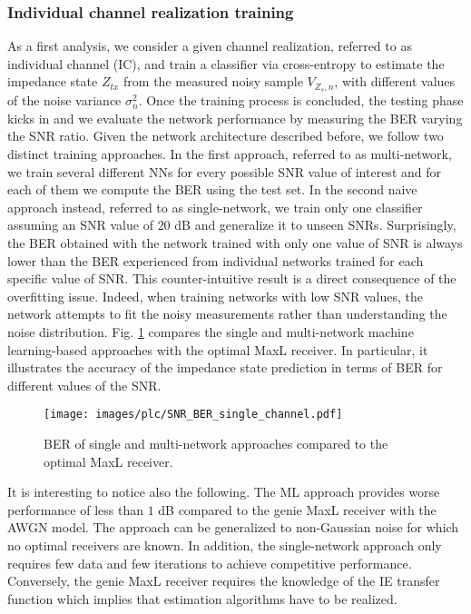 \subsubsection{Individual channel realization training}
As a first analysis, we consider a given channel realization, referred to as individual channel (IC), and train a classifier via cross-entropy to estimate the impedance state $Z_{tx}$ from the measured noisy sample $V_{Z_s,n}$, with different values of the noise variance $\sigma_n^2$. Once the training process is concluded, the testing phase kicks in and we evaluate the network performance by measuring the BER varying the SNR ratio. Given the network architecture described before, we follow two distinct training approaches. In the first approach, referred to as multi-network, we train several different NNs for every possible SNR value of interest and for each of them we compute the BER using the test set. In the second naive approach instead, referred to as single-network, we train only one classifier assuming an SNR value of $20$ dB and generalize it to unseen SNRs. Surprisingly, the BER obtained with the network trained with only one value of SNR is always lower than the BER experienced from individual networks trained for each specific value of SNR. This counter-intuitive result is a direct consequence of the overfitting issue. Indeed, when training networks with low SNR values, the network attempts to fit the noisy measurements rather than understanding the noise distribution. Fig. \ref{fig:plc_ber1} compares the single and multi-network machine learning-based approaches with the optimal MaxL receiver. In particular, it illustrates the accuracy of the impedance state prediction in terms of BER for different values of the SNR.
\begin{figure}
\centering
  	\texttt{[image: images/plc/SNR\_BER\_single\_channel.pdf]}
  	\caption{BER of single and multi-network approaches compared to the optimal MaxL receiver.}
  	\label{fig:plc_ber1}
\end{figure}

It is interesting to notice also the following. The ML approach provides worse performance of less than $1$ dB compared to the genie MaxL receiver with the AWGN model. The approach can be generalized to non-Gaussian noise for which no optimal receivers are known. In addition, the single-network approach only requires few data and few iterations to achieve competitive performance. Conversely, the genie MaxL receiver requires the knowledge of the IE transfer function which implies that estimation algorithms have to be realized.

